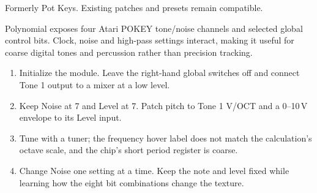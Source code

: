 Formerly Pot Keys. Existing patches and presets remain compatible.

Polynomial exposes four Atari POKEY tone/noise channels and selected global
control bits. Clock, noise and high-pass settings interact, making it useful
for coarse digital tones and percussion rather than precision tracking.

\begin{enumerate}
\item Initialize the module. Leave the right-hand global switches off and
connect Tone 1 output to a mixer at a low level.
\item Keep Noise at 7 and Level at 7. Patch pitch to Tone 1 V/OCT and a
0--10\,V envelope to its Level input.
\item Tune with a tuner; the frequency hover label does not match the
calculation's octave scale, and the chip's short period register is coarse.
\item Change Noise one setting at a time. Keep the note and level fixed
while learning how the eight bit combinations change the texture.
\end{enumerate}
